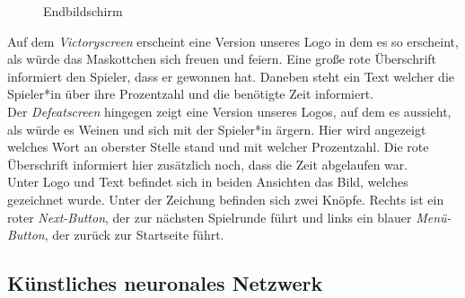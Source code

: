 \documentclass[11pt]{article}
\begin{document}
\begin{figure}[H]
\centering
\caption{\label{fig:endscreen} Endbildschirm}
\end{figure}

Auf dem \textit{Victoryscreen} erscheint eine Version unseres Logo in dem es so erscheint, als würde das Maskottchen sich freuen und feiern. Eine große rote Überschrift informiert den Spieler, dass er gewonnen hat. Daneben steht ein Text welcher die Spieler*in über ihre Prozentzahl und die benötigte Zeit informiert.\\
Der \textit{Defeatscreen} hingegen zeigt eine Version unseres Logos, auf dem es aussieht, als würde es Weinen und sich mit der Spieler*in ärgern. Hier wird angezeigt welches Wort an oberster Stelle stand und mit welcher Prozentzahl. Die rote Überschrift informiert hier zusätzlich noch, dass die Zeit abgelaufen war.\\
Unter Logo und Text befindet sich in beiden Ansichten das Bild, welches gezeichnet wurde. Unter der Zeichung befinden sich zwei Knöpfe. Rechts ist ein roter \textit{Next-Button}, der zur nächsten Spielrunde führt und links ein blauer \textit{Menü-Button}, der zurück zur Startseite führt.

\subsection{Künstliches neuronales Netzwerk}
\end{document}
